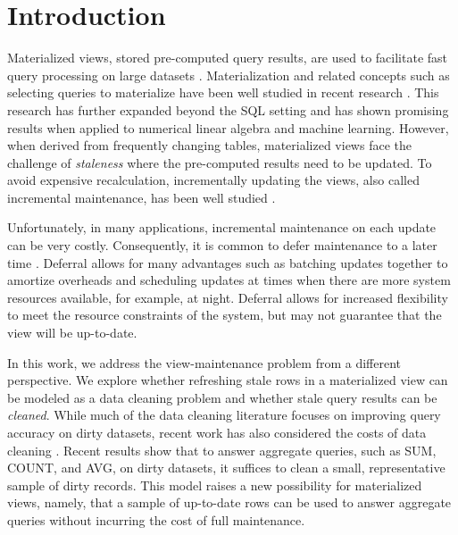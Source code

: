 \section{Introduction}
Materialized views, stored pre-computed query results, are used to facilitate fast query processing on large datasets \cite{gupta1995maintenance, chirkova2011materialized, halevy2001answering}.
Materialization and related concepts such as selecting queries to materialize
have been well studied in recent research \cite{zaharia2012resilient,lefevre2014opportunistic, bailis2014scalable, perez2014history}.
This research has further expanded beyond the SQL setting \cite{nikolic2014linview, zhang2014mat} and 
has shown promising results when applied to numerical linear algebra and machine learning.
However, when derived from frequently changing tables,
materialized views face the challenge of \emph{staleness} where the pre-computed results need to be updated.
To avoid expensive recalculation, incrementally updating the views,
also called incremental maintenance, has been well studied \cite{gupta1995maintenance, chirkova2011materialized}.

Unfortunately, in many applications, incremental maintenance on each update can be very costly. 
Consequently, it is common to defer maintenance to a later time \cite{chirkova2011materialized, zhou2007lazy}.
Deferral allows for many advantages such as batching updates together to amortize overheads and scheduling updates at times when there are more system resources available, for example, at night.
Deferral allows for increased flexibility to meet the resource constraints of the system, but may not guarantee that the view will be up-to-date.


In this work, we address the view-maintenance problem from a different perspective.
We explore whether refreshing stale rows in a materialized view can be modeled as a data cleaning problem and whether stale query results can be \emph{cleaned}.
While much of the data cleaning literature focuses on improving query accuracy on dirty datasets,
recent work has also considered the costs of data cleaning \cite{wang1999sample}.
Recent results show that to answer aggregate queries, such as SUM, COUNT, and AVG, on dirty datasets, it suffices to clean a small, representative sample of dirty records.
This model raises a new possibility for materialized views, namely, that a sample of up-to-date rows can be used to answer aggregate queries without incurring the cost of full maintenance.

